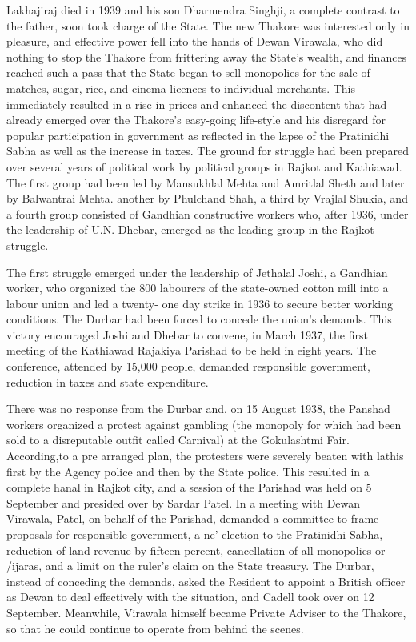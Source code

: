 Lakhajiraj died in 1939 and his son Dharmendra Singhji, a complete contrast to the father, soon took charge of the State. The new Thakore was interested only in pleasure, and effective power fell into the hands of Dewan Virawala, who did nothing to stop the Thakore from frittering away the State's wealth, and finances reached such a pass that the State began to sell monopolies for the sale of matches, sugar, rice, and cinema licences to individual merchants. This immediately resulted in a rise in prices and enhanced the discontent that had already emerged over the Thakore's easy-going life-style and his disregard for popular participation in government as reflected in the lapse of the Pratinidhi Sabha as well as the increase in taxes. The ground for struggle had been prepared over several years of political work by political groups in Rajkot and Kathiawad. The first group had been led by Mansukhlal Mehta and Amritlal Sheth and later by Balwantrai Mehta. another by Phulchand Shah, a third by Vrajlal Shukia, and a fourth group consisted of Gandhian constructive workers who, after 1936, under the leadership of U.N. Dhebar, emerged as the leading group in the Rajkot struggle. 

The first struggle emerged under the leadership of Jethalal Joshi, a Gandhian worker, who organized the 800 labourers of the state-owned cotton mill into a labour union and led a twenty- one day strike in 1936 to secure better working conditions. The Durbar had been forced to concede the union's demands. This victory encouraged Joshi and Dhebar to convene, in March 1937, the first meeting of the Kathiawad Rajakiya Parishad to be held in eight years. The conference, attended by 15,000 people, demanded responsible government, reduction in taxes and state expenditure. 

There was no response from the Durbar and, on 15 August 1938, the Panshad workers organized a protest against gambling (the monopoly for which had been sold to a disreputable outfit called Carnival) at the Gokulashtmi Fair. According,to a pre­ arranged plan, the protesters were severely beaten with lathis first by the Agency police and then by the State police. This resulted in a complete hanal in Rajkot city, and a session of the Parishad was held on 5 September and presided over by Sardar Patel. In a meeting with Dewan Virawala, Patel, on behalf of the Parishad, demanded a committee to frame proposals for responsible government, a ne' election to the Pratinidhi Sabha, reduction of land revenue by fifteen percent, cancellation of all monopolies or /ijaras, and a limit on the ruler's claim on the State treasury. The Durbar, instead of conceding the demands, asked the Resident to appoint a British officer as Dewan to deal effectively with the situation, and Cadell took over on 12 September. Meanwhile, Virawala himself became Private Adviser to the Thakore, so that he could continue to operate from behind the scenes. 

